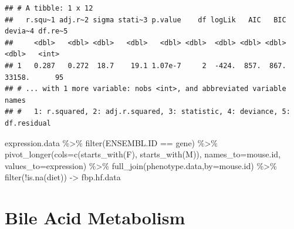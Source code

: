 \documentclass[
]{article}
\newenvironment{Shaded}{\begin{snugshade}}{\end{snugshade}}
\newcommand{\AttributeTok}[1]{\textcolor[rgb]{0.77,0.63,0.00}{#1}}
\newcommand{\FunctionTok}[1]{\textcolor[rgb]{0.00,0.00,0.00}{#1}}
\newcommand{\NormalTok}[1]{#1}
\newcommand{\OtherTok}[1]{\textcolor[rgb]{0.56,0.35,0.01}{#1}}
\newcommand{\SpecialCharTok}[1]{\textcolor[rgb]{0.00,0.00,0.00}{#1}}
\newcommand{\StringTok}[1]{\textcolor[rgb]{0.31,0.60,0.02}{#1}}
\begin{document}
\begin{verbatim}
## # A tibble: 1 x 12
##   r.squ~1 adj.r~2 sigma stati~3 p.value    df logLik   AIC   BIC devia~4 df.re~5
##     <dbl>   <dbl> <dbl>   <dbl>   <dbl> <dbl>  <dbl> <dbl> <dbl>   <dbl>   <int>
## 1   0.287   0.272  18.7    19.1 1.07e-7     2  -424.  857.  867.  33158.      95
## # ... with 1 more variable: nobs <int>, and abbreviated variable names
## #   1: r.squared, 2: adj.r.squared, 3: statistic, 4: deviance, 5: df.residual
\end{verbatim}

\begin{Shaded}
\begin{Highlighting}[]
\NormalTok{expression.data }\SpecialCharTok{\%\textgreater{}\%}
  \FunctionTok{filter}\NormalTok{(ENSEMBL.ID }\SpecialCharTok{==}\NormalTok{ gene) }\SpecialCharTok{\%\textgreater{}\%}
  \FunctionTok{pivot\_longer}\NormalTok{(}\AttributeTok{cols=}\FunctionTok{c}\NormalTok{(}\FunctionTok{starts\_with}\NormalTok{(}\StringTok{\textquotesingle{}F\textquotesingle{}}\NormalTok{),}
                      \FunctionTok{starts\_with}\NormalTok{(}\StringTok{\textquotesingle{}M\textquotesingle{}}\NormalTok{)),}
               \AttributeTok{names\_to=}\StringTok{\textquotesingle{}mouse.id\textquotesingle{}}\NormalTok{,}
               \AttributeTok{values\_to=}\StringTok{\textquotesingle{}expression\textquotesingle{}}\NormalTok{) }\SpecialCharTok{\%\textgreater{}\%}
  \FunctionTok{full\_join}\NormalTok{(phenotype.data,}\AttributeTok{by=}\StringTok{\textquotesingle{}mouse.id\textquotesingle{}}\NormalTok{) }\SpecialCharTok{\%\textgreater{}\%}
  \FunctionTok{filter}\NormalTok{(}\SpecialCharTok{!}\FunctionTok{is.na}\NormalTok{(diet)) }\OtherTok{{-}\textgreater{}}\NormalTok{ fbp.hf.data}
\end{Highlighting}
\end{Shaded}

\hypertarget{bile-acid-metabolism}{%
\section{Bile Acid Metabolism}\label{bile-acid-metabolism}}
\end{document}
